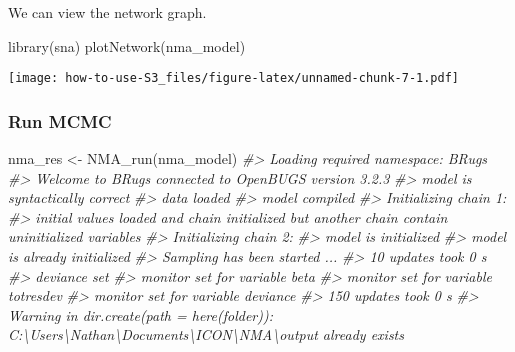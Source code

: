 \documentclass[
]{article}
\newenvironment{Shaded}{\begin{snugshade}}{\end{snugshade}}
\newcommand{\CommentTok}[1]{\textcolor[rgb]{0.56,0.35,0.01}{\textit{#1}}}
\newcommand{\FunctionTok}[1]{\textcolor[rgb]{0.00,0.00,0.00}{#1}}
\newcommand{\NormalTok}[1]{#1}
\newcommand{\OtherTok}[1]{\textcolor[rgb]{0.56,0.35,0.01}{#1}}
\begin{document}
We can view the network graph.

\begin{Shaded}
\begin{Highlighting}[]
\FunctionTok{library}\NormalTok{(sna)}
\FunctionTok{plotNetwork}\NormalTok{(nma\_model)}
\end{Highlighting}
\end{Shaded}

\texttt{[image: how-to-use-S3\_files/figure-latex/unnamed-chunk-7-1.pdf]}

\hypertarget{run-mcmc}{%
\subsubsection{Run MCMC}\label{run-mcmc}}

\begin{Shaded}
\begin{Highlighting}[]
\NormalTok{nma\_res }\OtherTok{\textless{}{-}} \FunctionTok{NMA\_run}\NormalTok{(nma\_model)}
\CommentTok{\#\textgreater{} Loading required namespace: BRugs}
\CommentTok{\#\textgreater{} Welcome to BRugs connected to OpenBUGS version 3.2.3}
\CommentTok{\#\textgreater{} model is syntactically correct}
\CommentTok{\#\textgreater{} data loaded}
\CommentTok{\#\textgreater{} model compiled}
\CommentTok{\#\textgreater{} Initializing chain 1:}
\CommentTok{\#\textgreater{} initial values loaded and chain initialized but another chain contain uninitialized variables}
\CommentTok{\#\textgreater{} Initializing chain 2:}
\CommentTok{\#\textgreater{} model is initialized}
\CommentTok{\#\textgreater{} model is already initialized}
\CommentTok{\#\textgreater{} Sampling has been started ...}
\CommentTok{\#\textgreater{} 10 updates took 0 s}
\CommentTok{\#\textgreater{} deviance set}
\CommentTok{\#\textgreater{} monitor set for variable \textquotesingle{}beta\textquotesingle{}}
\CommentTok{\#\textgreater{} monitor set for variable \textquotesingle{}totresdev\textquotesingle{}}
\CommentTok{\#\textgreater{} monitor set for variable \textquotesingle{}deviance\textquotesingle{}}
\CommentTok{\#\textgreater{} 150 updates took 0 s}
\CommentTok{\#\textgreater{} Warning in dir.create(path = here(folder)): \textquotesingle{}C:\textbackslash{}Users\textbackslash{}Nathan\textbackslash{}Documents\textbackslash{}ICON\textbackslash{}NMA\textbackslash{}output\textquotesingle{} already exists}


\end{Highlighting}
\end{Shaded}
\end{document}
